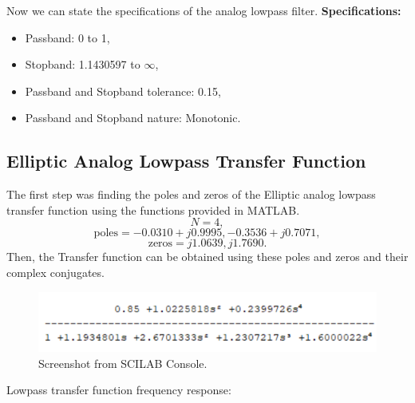 \documentclass[12pt]{article}
\begin{document}
Now we can state the specifications of the analog lowpass filter.
\newline
\hline
\vspace{10pt}
\textbf{Specifications:}
\begin{itemize}
    \item Passband: 0 to 1,
    \item Stopband: 1.1430597 to  $\infty$,
    \item Passband and Stopband tolerance: 0.15,
    \item Passband and Stopband nature: Monotonic.
\end{itemize}
\hline

\subsection{Elliptic Analog Lowpass Transfer Function}
The first step was finding the poles and zeros of the Elliptic analog lowpass transfer function using the functions provided in MATLAB.
\[N = 4,\]
\[\text{poles} = -0.0310 + j0.9995, -0.3536 + j0.7071,\]
\[\text{zeros} = j1.0639, j1.7690.\]
Then, the Transfer function can be obtained using these poles and zeros and their complex conjugates.

\begin{figure}[h]
    \centering
    \includegraphics{h_lpf_bp.png}
    \caption{Screenshot from SCILAB Console.}
\end{figure}
Lowpass transfer function frequency response:
\end{document}
